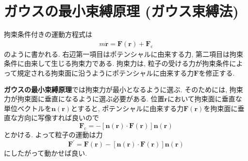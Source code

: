\section{ガウスの最小束縛原理 (ガウス束縛法)}
拘束条件付きの運動方程式は
\begin{align}
    m \ddot{\bm{r}}
    =
    \bm{F} (\bm{r}) + \bm{F}_{\mathrm{c}}
    \label{Eq:EoM-constrain}
\end{align}
のように書かれる.
右辺第一項目はポテンシャルに由来する力, 第二項目は拘束条件に由来して生じる拘束力である.
拘束力は, 粒子の受ける力が拘束条件によって規定される拘束面に沿うようにポテンシャルに由来する力$\bm{F}$を修正する.

\textbf{ガウスの最小束縛原理}では拘束力が最小となるように選ぶ.
そのためには, 拘束力が拘束面に垂直になるように選ぶ必要がある.
位置$\bm{r}$において拘束面に垂直な単位ベクトルを$\bm{n}(\bm{r})$とすると, ポテンシャルに由来する力$\bm{F}(\bm{r})$を拘束面に垂直な方向に写像すれば良いので
\begin{equation}
    \bm{F}_{\mathrm{c}}
    =
    - [\bm{n} (\bm{r}) \cdot \bm{F}(\bm{r})] \bm{n}(\bm{r})
\end{equation}
とかける. よって粒子の運動は力
\begin{equation}
    \bm{F}^{\prime} = \bm{F}(\bm{r}) - [\bm{n} (\bm{r}) \cdot \bm{F}(\bm{r})] \bm{n}(\bm{r})
\end{equation}
にしたがって動かせば良い.

